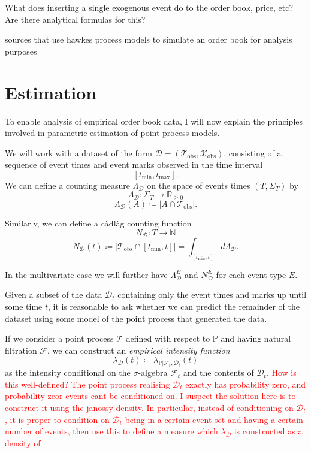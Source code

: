 \documentclass[honours,12pt]{unswthesis}
\numberwithin{equation}{section}
\begin{document}
What does inserting a single exogenous event do to the order book, price, etc? Are there analytical formulas for this?


\cite{AbergelJedidi} \cite{Toke} sources that use hawkes process models to simulate an order book for analysis purposes

\chapter{Estimation}%

To enable analysis of empirical order book data, I will now explain the principles involved in parametric estimation of point process models.

We will work with a dataset of the form $\mathcal{D} = \left(\mathcal{T}_\mathrm{obs},\mathcal{X}_\mathrm{obs}\right)$, consisting of a sequence of event times and event marks observed in the time interval $$[t_\mathrm{min},t_\mathrm{max}].$$
We can define a counting measure $\Lambda_\mathcal{D}$ on the space of events times $(T,\Sigma_T)$ by
$$\Lambda_{\mathcal{D}} : \Sigma_T \to \mathbb{R}_{\geq 0}$$
$$\Lambda_{\mathcal{D}}(A) \coloneq \left\vert A\cap\mathcal{T}_\mathrm{obs}\right\vert.$$

Similarly, we can define a càdlàg counting function
$$N_\mathcal{D} : T \to \mathbb{N}$$
$$N_\mathcal{D}(t) \coloneq \left\vert \mathcal{T}_\mathrm{obs}\cap [t_\mathrm{min},t]\right\vert = \int_{[t_\mathrm{min},t]} d\Lambda_\mathcal{D}.$$

In the multivariate case we will further have $\Lambda_\mathcal{D}^E$ and $N_\mathcal{D}^E$ for each event type $E$.

Given a subset of the data $\mathcal{D}_t$ containing only the event times and marks up until some time $t$, it is reasonable to ask whether we can predict the remainder of the dataset using some model of the point process that generated the data.

If we consider a point process $\mathcal{T}$ defined with respect to $\mathbb{P}$ and having natural filtration $\mathcal{F}$, we can construct an \textit{empirical intensity function}
$$\lambda_\mathcal{D}(t) \coloneq \lambda_{\mathbb{P}\vert\mathcal{F}_t,\mathcal{D}_t}(t)$$
as the intensity conditional on the $\sigma$-algebra $\mathcal{F}_t$ and the contents of $\mathcal{D}_t$. \textcolor{red}{How is this well-defined? The point process realising $\mathcal{D}_t$ exactly has probability zero, and probability-zeor events cant be conditioned on. I suspect the solution here is to construct it using the janossy density. In particular, instead of conditioning on $\mathcal{D}_t$, it is proper to condition on $\mathcal{D}_t$ being in a certain event set and having a certain number of events, then use this to define a measure which $\lambda_\mathcal{D}$ is constructed as a density of}
\end{document}

